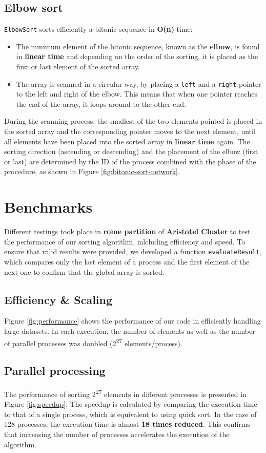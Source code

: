 \documentclass{article}
\begin{document}
\subsection{Elbow sort}
\texttt{ElbowSort} sorts efficiently a bitonic sequence in \textbf{O(n)} time:
\begin{itemize}
\item
The minimum element of the bitonic sequence, known as the \textbf{elbow}, is found in \textbf{linear time} and depending on the order of the sorting, it is placed as the first or last element of the sorted array.
\item 
The array is scanned in a circular way, by placing a \texttt{left} and a \texttt{right} pointer to the left and right of the elbow. This means that when one pointer reaches the end of the array, it loops around to the other end.  
\end{itemize}
During the scanning process, the smallest of the two elements pointed is placed in the sorted array and the corresponding pointer moves to the next element, until all elements have been placed into the sorted array in \textbf{linear time} again. The sorting direction (ascending or descending) and the placement of the elbow (first or last) are determined by the ID of the process combined with the phase of the procedure, as shown in Figure \ref{fig:bitonic-sort-network}.

\section{Benchmarks}
Different testings took place in \textbf{rome partition} of \href{https://hpc.it.auth.gr/}{\textbf{Aristotel Cluster}} to test the performance of our sorting algorithm, inlcluding efficiency and speed. To ensure that valid results were provided, we developed a function \texttt{evaluateResult}, which compares only the last element of a process and the first element of the next one to confirm that the global array is sorted.

\subsection{Efficiency \& Scaling}
Figure \ref{fig:performance} shows the performance of our code in efficiently handling large datasets. In each execution, the number of elements as well as the number of parallel processes was doubled (2\textsuperscript{27} elements/process).

\subsection{Parallel processing}
The performance of sorting 2\textsuperscript{27} elements in different processes is presented in Figure \ref{fig:speedup}. The speedup is calculated by comparing the execution time to that of a single process, which is equivalent to using quick sort. In the case of 128 processes, the execution time is almost \textbf{18 times reduced}. This confirms that increasing the number of processes accelerates the execution of the algorithm.
\end{document}
